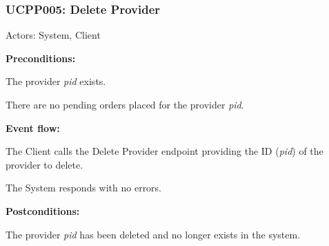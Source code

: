 \begin{ucbox}{\subsubsection{UCPP005: Delete Provider}}
\label{UCPP005}

Actors: System, Client

\textbf{Preconditions:}

\ucitem The provider \textit{pid} exists.

\ucitem There are no pending orders placed for the provider \textit{pid}.

\textbf{Event flow:}

\ucitem The Client calls the Delete Provider endpoint providing the ID (\textit{pid}) of the provider to delete.

\ucitem The System responds with no errors.

\textbf{Postconditions:}

\ucitem The provider \textit{pid} has been deleted and no longer exists in the system.

\end{ucbox}
\newpage